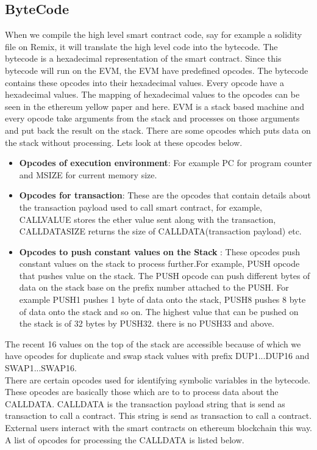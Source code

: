 \documentclass{article}
\begin{document}
\subsection*{ByteCode}
When we compile the high level smart contract code, say for example a solidity file on Remix, it will translate the high level code into the bytecode. The bytecode is a hexadecimal representation of the smart contract. Since this bytecode will run on the EVM, the EVM have predefined opcodes. The bytecode contains these opcodes into their hexadecimal values. Every opcode have a hexadecimal values. The mapping of hexadecimal values to the opcodes can be seen in the ethereum yellow paper and here. EVM is a stack based machine and every opcode take arguments from the stack and processes on those arguments and put back the result on the stack. There are some opcodes which puts data on the stack without processing. Lets look at these opcodes below.
\begin{itemize}
    \item \textbf{Opcodes of execution environment}: For example PC for program counter and MSIZE for current memory size.
    \item \textbf{Opcodes for transaction}: These are the opcodes that contain details about the transaction payload used to call smart contract, for example, CALLVALUE stores the ether value sent along with the transaction, CALLDATASIZE returns the size of CALLDATA(transaction payload) etc.
    \item \textbf{Opcodes to push constant values on the Stack} : These opcodes push constant values on the stack to process further.For example, PUSH opcode that pushes value on the stack. The PUSH opcode can push different bytes of data on the stack base on the prefix number attached to the PUSH. For example PUSH1 pushes 1 byte of data onto the stack, PUSH8 pushes 8 byte of data onto the stack and so on. The highest value that can be pushed on the stack is of 32 bytes by PUSH32. there is no PUSH33 and above. 
\end{itemize}
The recent 16 values on the top of the stack are accessible because of which we have opcodes for duplicate and swap stack values with prefix DUP1...DUP16 and SWAP1...SWAP16.\\
There are certain opcodes used for identifying symbolic variables in the bytecode. These opcodes are basically those which are to to process data about the CALLDATA. CALLDATA is the transaction payload string that is send as transaction to call a contract. This string is send as transaction to call a contract. External users interact with the smart contracts on ethereum blockchain this way. A list of opcodes for processing the CALLDATA is listed below.
\end{document}
